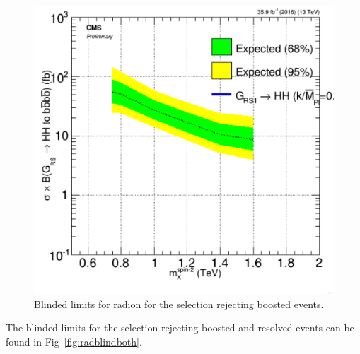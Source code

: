 \begin{figure}[thb!]
\begin{center}
\includegraphics[scale=0.5]{Figures/brazflag_Rad_boost_v2.pdf}
\end{center}
\caption{Blinded limits for radion for the selection rejecting boosted events.}
\label{fig:radblindboost}
\end{figure} 

The blinded limits for the selection rejecting boosted and resolved events can be found in Fig~\ref{fig:radblindboth}.

